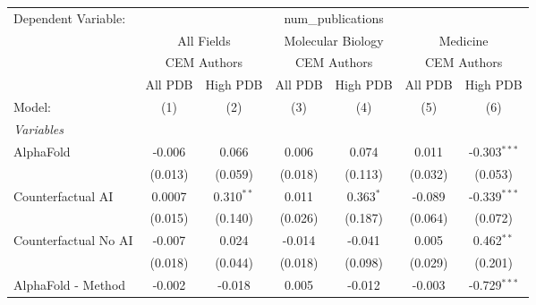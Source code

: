\begingroup
\centering
\begin{tabular}{lcccccc}
   \tabularnewline \midrule \midrule
   Dependent Variable: & \multicolumn{6}{c}{num\_publications}\\
 & \multicolumn{2}{c}{All Fields} & \multicolumn{2}{c}{Molecular Biology} & \multicolumn{2}{c}{Medicine} \\
\cmidrule(lr){2-3} \cmidrule(lr){4-5} \cmidrule(lr){6-7}
 & \multicolumn{2}{c}{CEM Authors} & \multicolumn{2}{c}{CEM Authors} & \multicolumn{2}{c}{CEM Authors} \\
\cmidrule(lr){2-3} \cmidrule(lr){4-5} \cmidrule(lr){6-7}
 & \multicolumn{1}{c}{All PDB} & \multicolumn{1}{c}{High PDB} & \multicolumn{1}{c}{All PDB} & \multicolumn{1}{c}{High PDB} & \multicolumn{1}{c}{All PDB} & \multicolumn{1}{c}{High PDB} \\
\cmidrule(lr){2-2} \cmidrule(lr){3-3} \cmidrule(lr){4-4} \cmidrule(lr){5-5} \cmidrule(lr){6-6} \cmidrule(lr){7-7}
   Model:                                                     & (1)           & (2)           & (3)     & (4)            & (5)          & (6)\\  
   \midrule
   \emph{Variables}\\
   AlphaFold                                                  & -0.006        & 0.066         & 0.006   & 0.074          & 0.011        & -0.303$^{***}$\\   
                                                              & (0.013)       & (0.059)       & (0.018) & (0.113)        & (0.032)      & (0.053)\\   
   Counterfactual AI                                          & 0.0007        & 0.310$^{**}$  & 0.011   & 0.363$^{*}$    & -0.089       & -0.339$^{***}$\\   
                                                              & (0.015)       & (0.140)       & (0.026) & (0.187)        & (0.064)      & (0.072)\\   
   Counterfactual No AI                                       & -0.007        & 0.024         & -0.014  & -0.041         & 0.005        & 0.462$^{**}$\\   
                                                              & (0.018)       & (0.044)       & (0.018) & (0.098)        & (0.029)      & (0.201)\\   
   AlphaFold - Method                                         & -0.002        & -0.018        & 0.005   & -0.012         & -0.003       & -0.729$^{***}$\\   

\end{tabular}
